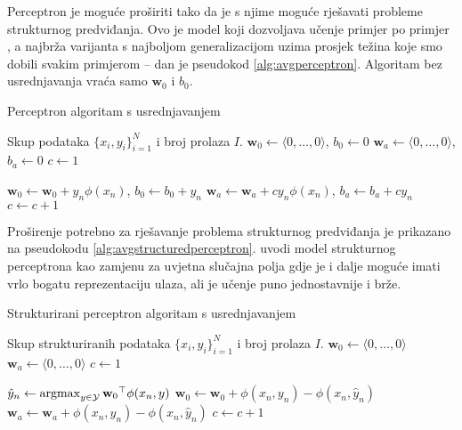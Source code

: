 Perceptron \citep{rosenblatt1958perceptron} je moguće proširiti tako da je s
njime moguće rješavati probleme strukturnog predviđanja. Ovo je model koji
dozvoljava učenje primjer po primjer , a najbrža varijanta
s najboljom generalizacijom uzima prosjek težina koje smo dobili svakim
primjerom \citep{freund1999large,gentile2002new} -- dan je pseudokod
\ref{alg:avgperceptron}. Algoritam bez usrednjavanja vraća samo $\mathbf{w}_0$ i
$b_0$.

\begin{algorithm}
\caption{Perceptron algoritam s usrednjavanjem}\label{alg:avgperceptron}
\begin{algorithmic}[1]
\Require Skup podataka $\{x_i, y_i\}_{i=1}^N$ i broj prolaza $I$.
\State $\mathbf{w}_0 \gets \langle 0, \ldots, 0 \rangle$, $b_0 \gets 0$
\State $\mathbf{w}_a \gets \langle 0, \ldots, 0 \rangle$, $b_a \gets 0$
\State $c \gets 1$


    \State $\mathbf{w}_0 \gets \mathbf{w}_0 + y_n \phi(x_n)$, $b_0 \gets b_0 + y_n$
    \State $\mathbf{w}_a \gets \mathbf{w}_a + c y_n \phi(x_n)$, $b_a \gets b_a + c y_n$
    \EndIf
    \State $c \gets c + 1$
  \EndFor

\EndFor

\State {}
\end{algorithmic}
\end{algorithm}

Proširenje potrebno za rješavanje problema strukturnog predviđanja je prikazano
na pseudokodu \ref{alg:avgstructuredperceptron}.
\citet{collins2002discriminative} uvodi model strukturnog perceptrona
 kao zamjenu za uvjetna slučajna polja gdje je i
dalje moguće imati vrlo bogatu reprezentaciju ulaza, ali je učenje puno
jednostavnije i brže.

\begin{algorithm}
\caption{Strukturirani perceptron algoritam s usrednjavanjem}
\label{alg:avgstructuredperceptron}
\begin{algorithmic}[1]
\Require Skup strukturiranih podataka $\{x_i, y_i\}_{i=1}^N$ i broj prolaza $I$.
\State $\mathbf{w}_0 \gets \langle 0, \ldots, 0 \rangle$
\State $\mathbf{w}_a \gets \langle 0, \ldots, 0 \rangle$
\State $c \gets 1$

    \State $\hat{y}_n \gets \operatorname*{argmax}_{y \in \mathcal{Y}} {\mathbf{w}_0}^\top \phi(x_n, y)$ \label{alg:avgstructuredperceptron:argmax}
    \label{alg:structuredperceptron:condition}
    \State $\mathbf{w}_0 \gets \mathbf{w}_0 + \phi(x_n, y_n) - \phi(x_n, \hat{y}_n)$
    \State $\mathbf{w}_a \gets \mathbf{w}_a + \phi(x_n, y_n) - \phi(x_n, \hat{y}_n)$
    \EndIf
    \State $c \gets c + 1$
  \EndFor

\EndFor

\State {}
\end{algorithmic}
\end{algorithm}

